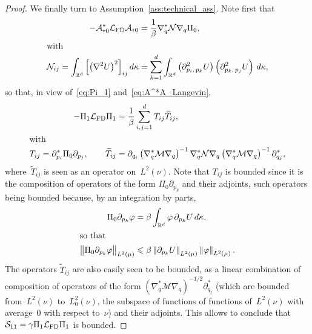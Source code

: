 \documentclass[AHL,Unicode,longabstracts,MathTools,published]{cedram}
\newcommand{\cLs}{\mathcal{S}}
\newcommand{\cLa}{\mathcal{A}}
\newcommand{\cLM}{\mathcal{M}}
\newcommand{\cLN}{\mathcal{N}}
\newcommand{\R}{\mathbb{R}}
\newcommand{\cLFD}{\mathcal{L}_{\rm FD}}
\newcommand{\subplus}{\textnormal{\texttt{+}}}
\renewcommand{\leq}{\leqslant}
\begin{document}
\begin{proof}
We finally turn to Assumption~\ref{ass:technical_ass}. Note first that
\begin{align*}
-\cLa_{\subplus 0}^* \cLFD \cLa_{\subplus 0} &= \frac{1}{\beta} \nabla_q^* \cLN \nabla_q \Pi_0,
\\
\intertext{with}
\cLN_{ij} = \int_{\R^d} \left[\left(\nabla^2 U\right)^2\right]_{ij} d\kappa &= \sum_{k=1}^d \int_{\R^d} \left(\partial^2_{p_i,\,p_k} U\right)\left(\partial^2_{p_k,\,p_j} U\right) \, d\kappa,
\end{align*}
so that, in view of~\eqref{eq:Pi_1} and~\eqref{eq:A^*A_Langevin},
\begin{align*}
-\Pi_1 \cLFD \Pi_1 &= \frac{1}{\beta}\sum_{i,j=1}^d T_{ij}\widetilde{T}_{ij},
\\
\intertext{with}
T_{ij} = \partial_{p_i}^* \Pi_0 \partial_{p_j},
\qquad
\widetilde{T}_{ij} &= \partial_{q_i} \left(\nabla_q^* \cLM \nabla_q\right)^{-1}\nabla_q^* \cLN \nabla_q \left(\nabla_q^* \cLM \nabla_q\right)^{-1} \partial_{q_j}^*,
\end{align*}
where~$\widetilde{T}_{ij}$ is seen as an operator on~$L^2(\nu)$. Note that $T_{ij}$ is bounded since it is the composition of operators of the form $\Pi_0 \partial_{p_k}$ and their adjoints, such operators being bounded because, by an integration by parts,
\begin{align*}
\Pi_0 \partial_{p_k} \varphi &= \beta \int_{\R^d} \varphi \, \partial_{p_k}U \, d\kappa,
\\
\intertext{so that}
\big\| \Pi_0 \partial_{p_k} \varphi \big\|_{L^2(\mu)} &\leq \beta\left\|\partial_{p_k} U\right\|_{L^2(\mu)}\left\|\varphi\right\|_{L^2(\mu)}.
\end{align*}
The operators $\widetilde{T}_{ij}$ are also easily seen to be bounded, as a linear combination of composition of operators of the form $(\nabla_q^* \cLM \nabla_q)^{-1/2} \partial_{q_j}^*$ (which are bounded from~$L^2(\nu)$ to~$L^2_0(\nu)$, the subspace of functions of functions of~$L^2(\nu)$ with average~0 with respect to~$\nu$) and their adjoints. This allows to conclude that $\cLs_{11} = \gamma \Pi_1\cLFD \Pi_1$ is bounded.


\end{proof}
\end{document}
